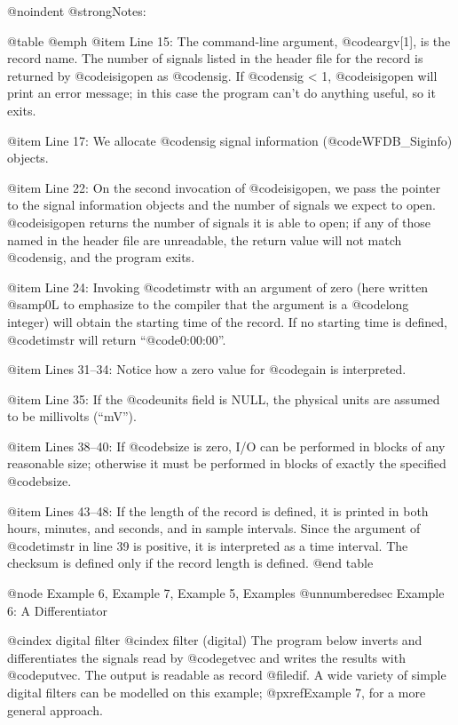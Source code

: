 {{{{{{{{{{@noindent
@strong{Notes:}

@table @emph
@item Line 15:
The command-line argument, @code{argv[1]}, is the record name.  The
number of signals listed in the header file for the record is returned by
@code{isigopen} as @code{nsig}.  If @code{nsig} < 1, @code{isigopen} will
print an error message; in this case the program can't do anything useful,
so it exits.

@item Line 17:
We allocate @code{nsig} signal information (@code{WFDB_Siginfo}) objects.

@item Line 22:
On the second invocation of @code{isigopen}, we pass the pointer to the
signal information objects and the number of signals we expect to open.
@code{isigopen} returns the number of signals it is able to open;  if
any of those named in the header file are unreadable, the return value
will not match @code{nsig}, and the program exits.

@item Line 24:
Invoking @code{timstr} with an argument of zero (here written @samp{0L}
to emphasize to the compiler that the argument is a @code{long} integer)
will obtain the starting time of the record.  If no starting time is
defined, @code{timstr} will return ``@code{0:00:00}''.

@item Lines 31--34:
Notice how a zero value for @code{gain} is interpreted.

@item Line 35:
If the @code{units} field is NULL, the physical units are assumed to be
millivolts (``mV'').

@item Lines 38--40:
If @code{bsize} is zero, I/O can be performed in blocks of any reasonable
size;  otherwise it must be performed in blocks of exactly the specified
@code{bsize}.

@item Lines 43--48:
If the length of the record is defined, it is printed in both hours,
minutes, and seconds, and in sample intervals.  Since the argument of
@code{timstr} in line 39 is positive, it is interpreted as a time
interval.  The checksum is defined only if the record length is
defined.
@end table

@node     Example 6, Example 7, Example 5, Examples
@unnumberedsec Example 6: A Differentiator

@cindex digital filter
@cindex filter (digital)
The program below inverts and differentiates the signals read by
@code{getvec} and writes the results with @code{putvec}.  The output is
readable as record @file{dif}.  A wide variety of simple digital filters
can be modelled on this example; @pxref{Example 7}, for a more general
approach.

}}}}}}}}}}
